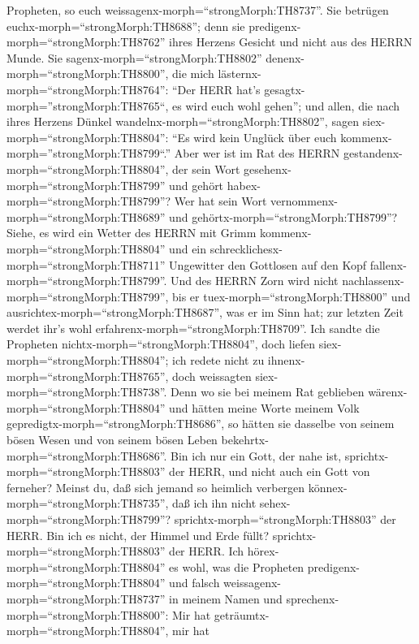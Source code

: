 Propheten, so euch weissagenx-morph=``strongMorph:TH8737''. Sie betrügen
euchx-morph=``strongMorph:TH8688''; denn sie
predigenx-morph=``strongMorph:TH8762'' ihres Herzens Gesicht und nicht
aus des HERRN Munde.  Sie
sagenx-morph=``strongMorph:TH8802'' denenx-morph=``strongMorph:TH8800'',
die mich lästernx-morph=``strongMorph:TH8764'': ``Der HERR hat's
gesagtx-morph=''strongMorph:TH8765``, es wird euch wohl gehen''; und
allen, die nach ihres Herzens Dünkel
wandelnx-morph=``strongMorph:TH8802'', sagen
siex-morph=``strongMorph:TH8804'': ``Es wird kein Unglück über euch
kommenx-morph=''strongMorph:TH8799``.''  Aber wer ist im
Rat des HERRN gestandenx-morph=``strongMorph:TH8804'', der sein Wort
gesehenx-morph=``strongMorph:TH8799'' und gehört
habex-morph=``strongMorph:TH8799''? Wer hat sein Wort
vernommenx-morph=``strongMorph:TH8689'' und
gehörtx-morph=``strongMorph:TH8799''?  Siehe, es wird ein
Wetter des HERRN mit Grimm kommenx-morph=``strongMorph:TH8804'' und ein
schrecklichesx-morph=``strongMorph:TH8711'' Ungewitter den Gottlosen auf
den Kopf fallenx-morph=``strongMorph:TH8799''.  Und des
HERRN Zorn wird nicht nachlassenx-morph=``strongMorph:TH8799'', bis er
tuex-morph=``strongMorph:TH8800'' und
ausrichtex-morph=``strongMorph:TH8687'', was er im Sinn hat; zur letzten
Zeit werdet ihr's wohl erfahrenx-morph=``strongMorph:TH8709''.
 Ich sandte die Propheten
nichtx-morph=``strongMorph:TH8804'', doch liefen
siex-morph=``strongMorph:TH8804''; ich redete nicht zu
ihnenx-morph=``strongMorph:TH8765'', doch weissagten
siex-morph=``strongMorph:TH8738''.  Denn wo sie bei meinem
Rat geblieben wärenx-morph=``strongMorph:TH8804'' und hätten meine Worte
meinem Volk gepredigtx-morph=``strongMorph:TH8686'', so hätten sie
dasselbe von seinem bösen Wesen und von seinem bösen Leben
bekehrtx-morph=``strongMorph:TH8686''.  Bin ich nur ein
Gott, der nahe ist, sprichtx-morph=``strongMorph:TH8803'' der HERR, und
nicht auch ein Gott von ferneher?  Meinst du, daß sich
jemand so heimlich verbergen könnex-morph=``strongMorph:TH8735'', daß
ich ihn nicht sehex-morph=``strongMorph:TH8799''?
sprichtx-morph=``strongMorph:TH8803'' der HERR. Bin ich es nicht, der
Himmel und Erde füllt? sprichtx-morph=``strongMorph:TH8803'' der HERR.
 Ich hörex-morph=``strongMorph:TH8804'' es wohl, was die
Propheten predigenx-morph=``strongMorph:TH8804'' und falsch
weissagenx-morph=``strongMorph:TH8737'' in meinem Namen und
sprechenx-morph=``strongMorph:TH8800'': Mir hat
geträumtx-morph=``strongMorph:TH8804'', mir hat
